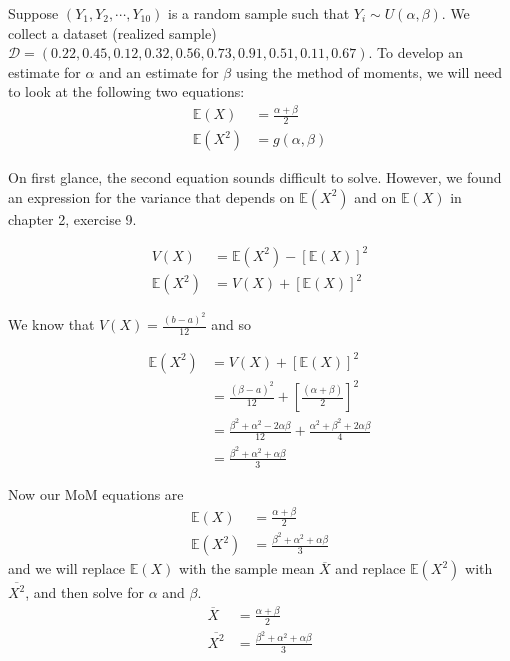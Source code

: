 \begin{VT1}

Suppose $(Y_{1},Y_{2},\cdots,Y_{10})$ is a random sample such that $Y_{i} \sim U(\alpha,\beta)$. We collect a dataset (realized sample) $\mathcal{D} = (0.22,0.45,0.12,0.32,0.56,0.73,0.91,0.51,0.11,0.67)$. 
To develop an estimate for $\alpha$ and an estimate for $\beta$ using the method of moments, we will need to look at the following two equations:
\begin{align}
    \mathbb{E}(X)     &= \frac{\alpha+\beta}{2}\\ 
    \mathbb{E}(X^{2}) &= g(\alpha,\beta) 
\end{align}

On first glance, the second equation sounds difficult to solve.
However, we found an expression for the variance that depends on $\mathbb{E}(X^{2})$ and on $\mathbb{E}(X)$ in chapter 2, exercise 9.

\begin{align}
    V(X) &= \mathbb{E}(X^2) - \left[\mathbb{E}(X)\right]^{2} \\
    \mathbb{E}(X^2) &= V(X) +  \left[\mathbb{E}(X)\right]^{2}  
\end{align}

We know that $V(X) = \frac{(b-a)^{2}}{12}$ and so 

\begin{align}
    \mathbb{E}(X^2) &= V(X) +  \left[\mathbb{E}(X)\right]^{2}  \\
                    &= \frac{(\beta-a)^{2}}{12} + \left[ \frac{(\alpha+\beta)}{2} \right]^{2} \\ 
                    &= \frac{\beta^{2} + \alpha^{2} - 2\alpha\beta}{12} + \frac{\alpha^{2}+\beta^{2}+2\alpha\beta}{4} \\ 
                    &= \frac{\beta^{2} + \alpha^{2} + \alpha\beta}{3}  
\end{align}

Now our MoM equations are 
\begin{align}
    \mathbb{E}(X)     &= \frac{\alpha+\beta}{2}\\ 
    \mathbb{E}(X^{2}) &=  \frac{\beta^{2} + \alpha^{2} + \alpha\beta}{3}
\end{align}
and we will replace $\mathbb{E}(X)$ with the sample mean $\overline{X}$ and replace $\mathbb{E}(X^{2})$ with $\overline{X^{2}}$, and then solve for $\alpha$ and $\beta$.  
\begin{align}
    \overline{X}     &= \frac{\alpha+\beta}{2}\\ 
    \overline{X^{2}} &=  \frac{\beta^{2} + \alpha^{2} + \alpha\beta}{3}
\end{align}


\end{VT1}
